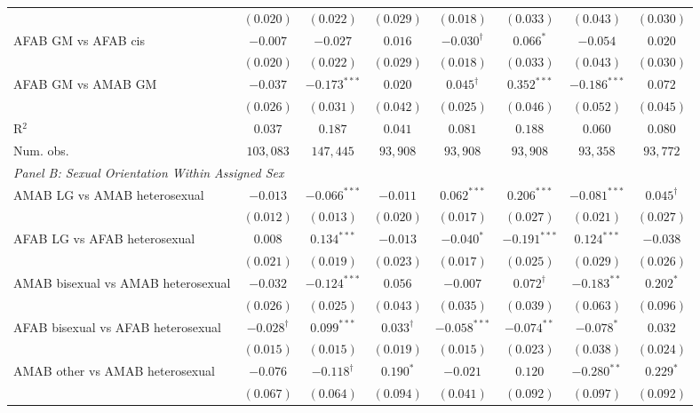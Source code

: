 \begin{table}[htpb!]
{\begin{tabular}{l c c c c c c c}
 & $(0.020)$ & $(0.022)$ & $(0.029)$ & $(0.018)$ & $(0.033)$ & $(0.043)$ & $(0.030)$ \\
AFAB GM vs AFAB cis & $-0.007$ & $-0.027$ & $0.016$ & $-0.030^{\dagger}$ & $0.066^{*}$ & $-0.054$ & $0.020$ \\
 & $(0.020)$ & $(0.022)$ & $(0.029)$ & $(0.018)$ & $(0.033)$ & $(0.043)$ & $(0.030)$ \\
AFAB GM vs AMAB GM & $-0.037$ & $-0.173^{***}$ & $0.020$ & $0.045^{\dagger}$ & $0.352^{***}$ & $-0.186^{***}$ & $0.072$ \\
 & $(0.026)$ & $(0.031)$ & $(0.042)$ & $(0.025)$ & $(0.046)$ & $(0.052)$ & $(0.045)$ \\
\hline
R$^2$ & $0.037$ & $0.187$ & $0.041$ & $0.081$ & $0.188$ & $0.060$ & $0.080$ \\
Num. obs. & $103,083$ & $147,445$ & $93,908$ & $93,908$ & $93,908$ & $93,358$ & $93,772$ \\
\hline
\multicolumn{8}{l}{\textit{Panel B: Sexual Orientation Within Assigned Sex}} \\
AMAB LG vs AMAB heterosexual & $-0.013$ & $-0.066^{***}$ & $-0.011$ & $0.062^{***}$ & $0.206^{***}$ & $-0.081^{***}$ & $0.045^{\dagger}$ \\
 & $(0.012)$ & $(0.013)$ & $(0.020)$ & $(0.017)$ & $(0.027)$ & $(0.021)$ & $(0.027)$ \\
AFAB LG vs AFAB heterosexual & $0.008$ & $0.134^{***}$ & $-0.013$ & $-0.040^{*}$ & $-0.191^{***}$ & $0.124^{***}$ & $-0.038$ \\
 & $(0.021)$ & $(0.019)$ & $(0.023)$ & $(0.017)$ & $(0.025)$ & $(0.029)$ & $(0.026)$ \\
AMAB bisexual vs AMAB heterosexual & $-0.032$ & $-0.124^{***}$ & $0.056$ & $-0.007$ & $0.072^{\dagger}$ & $-0.183^{**}$ & $0.202^{*}$ \\
 & $(0.026)$ & $(0.025)$ & $(0.043)$ & $(0.035)$ & $(0.039)$ & $(0.063)$ & $(0.096)$ \\
AFAB bisexual vs AFAB heterosexual & $-0.028^{\dagger}$ & $0.099^{***}$ & $0.033^{\dagger}$ & $-0.058^{***}$ & $-0.074^{**}$ & $-0.078^{*}$ & $0.032$ \\
 & $(0.015)$ & $(0.015)$ & $(0.019)$ & $(0.015)$ & $(0.023)$ & $(0.038)$ & $(0.024)$ \\
AMAB other vs AMAB heterosexual & $-0.076$ & $-0.118^{\dagger}$ & $0.190^{*}$ & $-0.021$ & $0.120$ & $-0.280^{**}$ & $0.229^{*}$ \\
 & $(0.067)$ & $(0.064)$ & $(0.094)$ & $(0.041)$ & $(0.092)$ & $(0.097)$ & $(0.092)$ \\

\end{tabular}}
\end{table}
